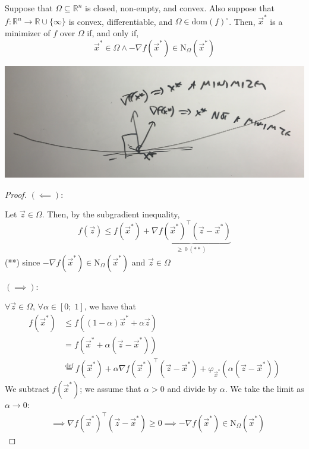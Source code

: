 \documentclass{article}
\newcommand{\R}{\mathbb{R}}
\begin{document}
Suppose that $\Omega \subseteq \R^n$ is closed, non-empty, and convex. Also suppose that $f\colon \R^n \to \R \cup \{\infty\}$ is convex, differentiable, and $\Omega \in \text{dom}(f)^\circ$. Then, $\vec{x}^*$ is a minimizer of $f$ over $\Omega$ if, and only if,
\[
    \vec{x}^* \in \Omega \wedge -\nabla f(\vec{x}^*) \in \text{N}_{\Omega}(\vec{x}^*)
\]

\begin{center}
    \includegraphics*[scale=0.08]{minimizer.JPG}
\end{center}

\begin{proof}
    $(\impliedby)$:

    Let $\vec{z} \in \Omega$. Then, by the subgradient inequality,
    \[
        f(\vec{z}) \leq f(\vec{x}^*) + \underbrace{\nabla f(\vec{x}^*)^\top(\vec{z} - \vec{x}^*)}_{\geq\, 0\, (**)}
    \]
    (**) since $-\nabla f(\vec{x}^*) \in \text{N}_{\Omega}(\vec{x}^*)$ and $\vec{z} \in \Omega$

    $(\implies)$:

    $\forall \vec{z} \in \Omega$, $\forall \alpha \in [0;\; 1]$, we have that
    \begin{align*}
        f(\vec{x}^*) &\leq f((1 - \alpha)\vec{x}^* + \alpha\vec{z}) \\
        &= f(\vec{x}^* + \alpha(\vec{z} - \vec{x}^*)) \\
        &\overset{\text{def}}{=} f(\vec{x}^*) + \alpha \nabla f(\vec{x}^*)^\top(\vec{z} - \vec{x}^*) + \varphi_{\vec{x}^*}(\alpha(\vec{z} - \vec{x}^*))
    \end{align*}
    We subtract $f(\vec{x}^*)$; we assume that $\alpha > 0$ and divide by $\alpha$. We take the limit as $\alpha \to 0$:
    \begin{align*}
        &\implies \nabla f(\vec{x}^*)^\top(\vec{z} - \vec{x}^*) \geq 0 \implies -\nabla f(\vec{x}^*) \in \text{N}_{\Omega}(\vec{x}^*)
    \end{align*}
\end{proof}
\end{document}
